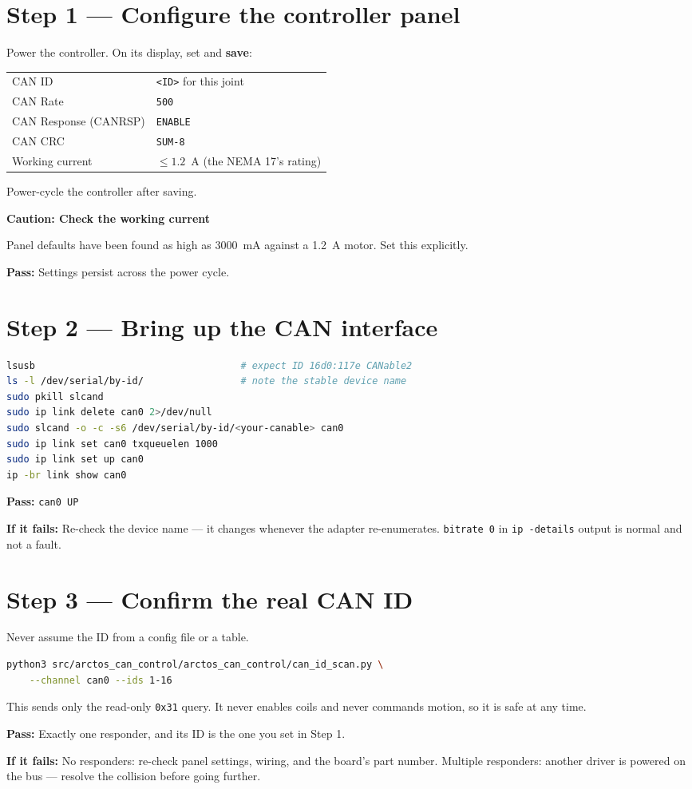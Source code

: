 \documentclass[11pt,letterpaper]{article}
\newenvironment{caution}[1]{%
    \par\addvspace{8pt}%
    \noindent{\color{cautionred}\rule{\linewidth}{0.8pt}}\par\vspace{2pt}
    \noindent\textbf{\color{cautionred}Caution: #1}\par\vspace{2pt}
}{%
    \par\vspace{2pt}\noindent{\color{cautionred}\rule{\linewidth}{0.4pt}}%
    \par\addvspace{8pt}%
}
\newcommand{\passif}[1]{\par\vspace{2pt}\noindent\textbf{\color{okgreen}Pass:} #1\par\vspace{4pt}}
\newcommand{\failif}[1]{\noindent\textbf{If it fails:} #1\par\vspace{6pt}}
\begin{document}
\section*{Step 1 --- Configure the controller panel}
Power the controller. On its display, set and \textbf{save}:

\begin{table}[h]
\centering
\begin{tabular}{ll}
\toprule
CAN ID & \texttt{<ID>} for this joint \\
CAN Rate & \texttt{500} \\
CAN Response (CANRSP) & \texttt{ENABLE} \\
CAN CRC & \texttt{SUM-8} \\
Working current & $\leq 1.2$~A (the NEMA 17's rating) \\
\bottomrule
\end{tabular}
\end{table}

Power-cycle the controller after saving.

\begin{caution}{Check the working current}
Panel defaults have been found as high as 3000~mA against a 1.2~A motor. Set this
explicitly.
\end{caution}
\passif{Settings persist across the power cycle.}

\section*{Step 2 --- Bring up the CAN interface}
\begin{lstlisting}[language=bash]
lsusb                                    # expect ID 16d0:117e CANable2
ls -l /dev/serial/by-id/                 # note the stable device name
sudo pkill slcand
sudo ip link delete can0 2>/dev/null
sudo slcand -o -c -s6 /dev/serial/by-id/<your-canable> can0
sudo ip link set can0 txqueuelen 1000
sudo ip link set up can0
ip -br link show can0
\end{lstlisting}
\passif{\texttt{can0 \quad UP}}
\failif{Re-check the device name --- it changes whenever the adapter re-enumerates.
\texttt{bitrate 0} in \texttt{ip -details} output is normal and not a fault.}

\section*{Step 3 --- Confirm the real CAN ID}
Never assume the ID from a config file or a table.
\begin{lstlisting}[language=bash]
python3 src/arctos_can_control/arctos_can_control/can_id_scan.py \
    --channel can0 --ids 1-16
\end{lstlisting}
This sends only the read-only \texttt{0x31} query. It never enables coils and never
commands motion, so it is safe at any time.
\passif{Exactly one responder, and its ID is the one you set in Step 1.}
\failif{No responders: re-check panel settings, wiring, and the board's part number.
Multiple responders: another driver is powered on the bus --- resolve the collision
before going further.}
\end{document}
